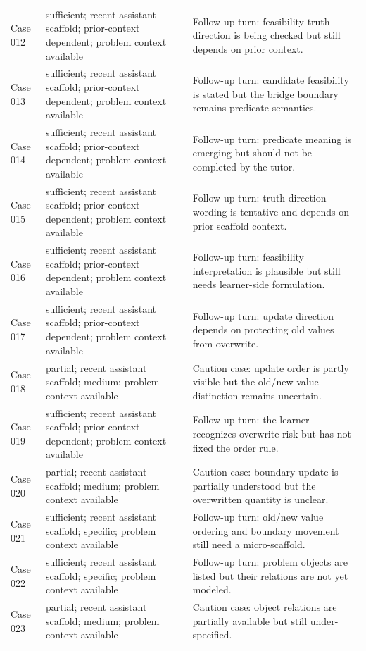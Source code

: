 \documentclass[11pt]{article}
\begin{document}
\begin{landscape}
\begin{xltabular}{\textwidth}{>{\raggedright\arraybackslash}p{0.08\textwidth}>{\raggedright\arraybackslash}p{0.34\textwidth}>{\raggedright\arraybackslash}X}
Case 012 & sufficient; recent assistant scaffold; prior-context dependent; problem context available & Follow-up turn: feasibility truth direction is being checked but still depends on prior context. \\
Case 013 & sufficient; recent assistant scaffold; prior-context dependent; problem context available & Follow-up turn: candidate feasibility is stated but the bridge boundary remains predicate semantics. \\
Case 014 & sufficient; recent assistant scaffold; prior-context dependent; problem context available & Follow-up turn: predicate meaning is emerging but should not be completed by the tutor. \\
Case 015 & sufficient; recent assistant scaffold; prior-context dependent; problem context available & Follow-up turn: truth-direction wording is tentative and depends on prior scaffold context. \\
Case 016 & sufficient; recent assistant scaffold; prior-context dependent; problem context available & Follow-up turn: feasibility interpretation is plausible but still needs learner-side formulation. \\
Case 017 & sufficient; recent assistant scaffold; prior-context dependent; problem context available & Follow-up turn: update direction depends on protecting old values from overwrite. \\
Case 018 & partial; recent assistant scaffold; medium; problem context available & Caution case: update order is partly visible but the old/new value distinction remains uncertain. \\
Case 019 & sufficient; recent assistant scaffold; prior-context dependent; problem context available & Follow-up turn: the learner recognizes overwrite risk but has not fixed the order rule. \\
Case 020 & partial; recent assistant scaffold; medium; problem context available & Caution case: boundary update is partially understood but the overwritten quantity is unclear. \\
Case 021 & sufficient; recent assistant scaffold; specific; problem context available & Follow-up turn: old/new value ordering and boundary movement still need a micro-scaffold. \\
Case 022 & sufficient; recent assistant scaffold; specific; problem context available & Follow-up turn: problem objects are listed but their relations are not yet modeled. \\
Case 023 & partial; recent assistant scaffold; medium; problem context available & Caution case: object relations are partially available but still under-specified. \\

\end{xltabular}
\end{landscape}
\end{document}

